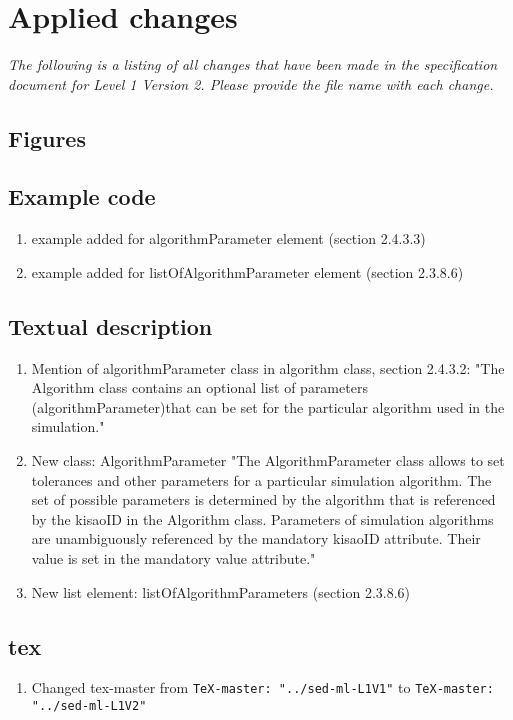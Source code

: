 \documentclass{article}
\newcommand{\code}[1]{\texttt{#1}}
\begin{document}
\section{Applied changes}
\emph{The following is a listing of all changes that have been made in the specification document for Level 1 Version 2. Please provide the file name with each change.}

\subsection{Figures}

\subsection{Example code}
\begin{enumerate}
\item example added for algorithmParameter element (section 2.4.3.3)
\item example added for listOfAlgorithmParameter element (section 2.3.8.6)
\end{enumerate}

\subsection{Textual description}

\begin{enumerate}
\item Mention of algorithmParameter class in algorithm class, section 2.4.3.2: "The Algorithm class contains an optional list of parameters (algorithmParameter)that can be set for the particular algorithm used in the simulation."
\item New class: AlgorithmParameter "The AlgorithmParameter class allows to set tolerances and other parameters for a particular simulation
algorithm. The set of possible parameters is determined by the algorithm that is referenced by the
kisaoID in the Algorithm class. Parameters of simulation algorithms are unambiguously referenced by
the mandatory kisaoID attribute. Their value is set in the mandatory value attribute."
\item New list element: listOfAlgorithmParameters (section 2.3.8.6)
\end{enumerate}

\subsection{tex}

\begin{enumerate}
\item Changed tex-master from  \code{TeX-master: "../sed-ml-L1V1"} to  \code{TeX-master: "../sed-ml-L1V2"}
\end{enumerate}
\end{document}
